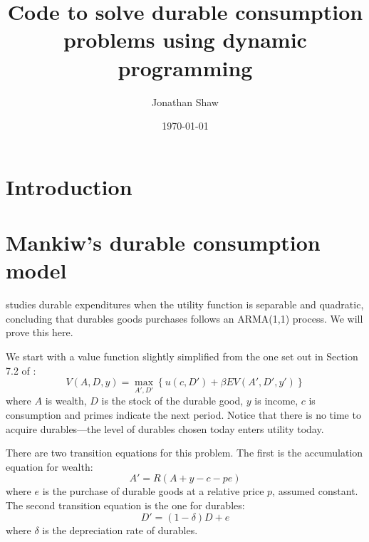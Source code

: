 \documentclass[12pt]{article}
\title{Code to solve durable consumption problems using dynamic programming}
\author{Jonathan Shaw}
\date{\today}
\begin{document}
\maketitle

\section{Introduction}

\section{Mankiw's durable consumption model}

\citet{mankiw1982hall} studies durable expenditures when the utility function is separable and quadratic, concluding that durables goods purchases follows an ARMA(1,1) process. We will prove this here.

We start with a value function slightly simplified from the one set out in Section 7.2 of \citet{adda2003dynamic}:
%
\begin{equation}
	V(A, D, y) = \max_{A', D'} \left\{ u(c, D') + \beta EV(A', D', y') \right\}
\end{equation}
%
where \(A\) is wealth, \(D\) is the stock of the durable good, \(y\) is income, \(c\) is consumption and primes indicate the next period. Notice that there is no time to acquire durables---the level of durables chosen today enters utility today.

There are two transition equations for this problem. The first is the accumulation equation for wealth:
%
\begin{equation}
	A' = R(A + y - c - pe)
\end{equation}
%
where \(e\) is the purchase of durable goods at a relative price \(p\), assumed constant. The second transition equation is the one for durables:
%
\begin{equation}
	D' = (1 - \delta)D + e \label{eqn:evoD}
\end{equation}
%
where \(\delta\) is the depreciation rate of durables.
\end{document}
